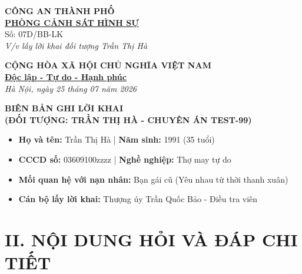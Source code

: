\documentclass[12pt,a4paper]{article}
\begin{document}
\noindent
\begin{minipage}[t]{0.45\textwidth}
    \begin{center}
        \textbf{CÔNG AN THÀNH PHỐ}\\
        \textbf{\underline{PHÒNG CẢNH SÁT HÌNH SỰ}}\\[0.2cm]
        \small{Số: 07D/BB-LK}\\
        \textit{V/v lấy lời khai đối tượng Trần Thị Hà}
    \end{center}
\end{minipage}
\hfill
\begin{minipage}[t]{0.52\textwidth}
    \begin{center}
        \textbf{CỘNG HÒA XÃ HỘI CHỦ NGHĨA VIỆT NAM}\\
        \textbf{\underline{Độc lập - Tự do - Hạnh phúc}}\\[0.2cm]
        \textit{Hà Nội, ngày 25 tháng 07 năm 2026}
    \end{center}
\end{minipage}

\vspace{0.8cm}

\begin{center}
    \textbf{\LARGE BIÊN BẢN GHI LỜI KHAI}\\
    \textbf{\large (ĐỐI TƯỢNG: TRẦN THỊ HÀ - CHUYÊN ÁN TEST-99)}
\end{center}

\vspace{0.3cm}

\begin{tcolorbox}[colback=gray!8!white,colframe=black!75!black,title=\textbf{I. THÔNG TIN NGƯỜI ĐƯỢC LẤY LỜI KHAI}]
\begin{itemize}[leftmargin=*]
    \item \textbf{Họ và tên:} Trần Thị Hà | \textbf{Năm sinh:} 1991 (35 tuổi)
    \item \textbf{CCCD số:} 03609100zzzz | \textbf{Nghề nghiệp:} Thợ may tự do
    \item \textbf{Mối quan hệ với nạn nhân:} Bạn gái cũ (Yêu nhau từ thời thanh xuân)
    \item \textbf{Cán bộ lấy lời khai:} Thượng úy Trần Quốc Bảo - Điều tra viên
\end{itemize}
\end{tcolorbox}

\section*{II. NỘI DUNG HỎI VÀ ĐÁP CHI TIẾT}
\end{document}
